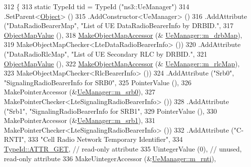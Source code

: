 \begin{DoxyCode}
312 \{
313   \textcolor{keyword}{static} TypeId  tid = TypeId (\textcolor{stringliteral}{"ns3::UeManager"})
314     .SetParent<\hyperlink{classns3_1_1Object_a40860402e64d8008fb42329df7097cdb}{Object}> ()
315     .AddConstructor<UeManager> ()
316     .AddAttribute (\textcolor{stringliteral}{"DataRadioBearerMap"}, \textcolor{stringliteral}{"List of UE DataRadioBearerInfo by DRBID."},
317                    \hyperlink{namespacens3_a5cac680c954929d49b48f4c40c1a2e08}{ObjectMapValue} (),
318                    \hyperlink{namespacens3_acfdf708e388c66beea68eb5ecdcb7456}{MakeObjectMapAccessor} (&
      \hyperlink{classns3_1_1UeManager_a18499c025730b63c73e5d93effff57aa}{UeManager::m\_drbMap}),
319                    MakeObjectMapChecker<LteDataRadioBearerInfo> ())
320     .AddAttribute (\textcolor{stringliteral}{"DataRadioRlcMap"}, \textcolor{stringliteral}{"List of UE Secondary RLC by DRBID."},
321                    \hyperlink{namespacens3_a5cac680c954929d49b48f4c40c1a2e08}{ObjectMapValue} (),
322                    \hyperlink{namespacens3_acfdf708e388c66beea68eb5ecdcb7456}{MakeObjectMapAccessor} (&
      \hyperlink{classns3_1_1UeManager_a64f37a901db7a322552ba08d87e65770}{UeManager::m\_rlcMap}),
323                    MakeObjectMapChecker<RlcBearerInfo> ())
324     .AddAttribute (\textcolor{stringliteral}{"Srb0"}, \textcolor{stringliteral}{"SignalingRadioBearerInfo for SRB0"},
325                    PointerValue (),
326                    MakePointerAccessor (&\hyperlink{classns3_1_1UeManager_a8125951721a3aeefbf6ea5af111f2f3f}{UeManager::m\_srb0}),
327                    MakePointerChecker<LteSignalingRadioBearerInfo> ())
328     .AddAttribute (\textcolor{stringliteral}{"Srb1"}, \textcolor{stringliteral}{"SignalingRadioBearerInfo for SRB1"},
329                    PointerValue (),
330                    MakePointerAccessor (&\hyperlink{classns3_1_1UeManager_a196852199b6a48c365eadfec4ba89935}{UeManager::m\_srb1}),
331                    MakePointerChecker<LteSignalingRadioBearerInfo> ())
332     .AddAttribute (\textcolor{stringliteral}{"C-RNTI"},
333                    \textcolor{stringliteral}{"Cell Radio Network Temporary Identifier"},
334                    \hyperlink{classns3_1_1TypeId_a3ab7b43b95f96391c514d609ca60e542a3dd4b476c9b257285c177d6c414b5fd0}{TypeId::ATTR\_GET}, \textcolor{comment}{// read-only attribute}
335                    UintegerValue (0), \textcolor{comment}{// unused, read-only attribute}
336                    MakeUintegerAccessor (&\hyperlink{classns3_1_1UeManager_a5a72b4fe818f21993bd7f05d7e2c4f83}{UeManager::m\_rnti}),

\end{DoxyCode}
